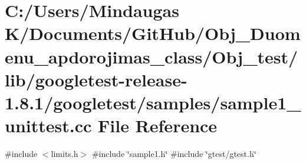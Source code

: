 \hypertarget{_obj__test_2lib_2googletest-release-1_88_81_2googletest_2samples_2sample1__unittest_8cc}{}\section{C\+:/\+Users/\+Mindaugas K/\+Documents/\+Git\+Hub/\+Obj\+\_\+\+Duomenu\+\_\+apdorojimas\+\_\+class/\+Obj\+\_\+test/lib/googletest-\/release-\/1.8.1/googletest/samples/sample1\+\_\+unittest.cc File Reference}
\label{_obj__test_2lib_2googletest-release-1_88_81_2googletest_2samples_2sample1__unittest_8cc}
{\ttfamily \#include $<$limits.\+h$>$}\newline
{\ttfamily \#include \char`\"{}sample1.\+h\char`\"{}}\newline
{\ttfamily \#include \char`\"{}gtest/gtest.\+h\char`\"{}}\newline
